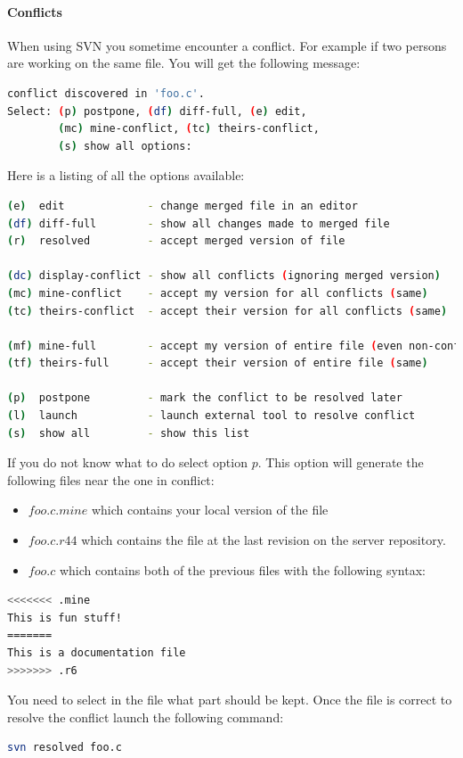 \paragraph{Conflicts}
\label{conflict}
When using SVN you sometime encounter a conflict. For example if two persons
are working on the same file. You will get the following message:
\begin{lstlisting}[language=bash]
conflict discovered in 'foo.c'.
Select: (p) postpone, (df) diff-full, (e) edit,
        (mc) mine-conflict, (tc) theirs-conflict,
        (s) show all options: 
\end{lstlisting}
Here is a listing of all the options available:
\begin{lstlisting}[language=bash]
(e)  edit             - change merged file in an editor
(df) diff-full        - show all changes made to merged file
(r)  resolved         - accept merged version of file

(dc) display-conflict - show all conflicts (ignoring merged version)
(mc) mine-conflict    - accept my version for all conflicts (same)
(tc) theirs-conflict  - accept their version for all conflicts (same)

(mf) mine-full        - accept my version of entire file (even non-conflicts)
(tf) theirs-full      - accept their version of entire file (same)

(p)  postpone         - mark the conflict to be resolved later
(l)  launch           - launch external tool to resolve conflict
(s)  show all         - show this list
\end{lstlisting}
%
If you do not know what to do select option $p$. This option will generate the
following files near the one in conflict:
\begin{itemize}
\item $foo.c.mine$ which contains your local version of the file
\item $foo.c.r44$ which contains the file at the last revision on the server
repository.
\item $foo.c$ which contains both of the previous files with the following
syntax:
\end{itemize}
\begin{lstlisting}[language=bash]
<<<<<<< .mine
This is fun stuff!
=======
This is a documentation file
>>>>>>> .r6
\end{lstlisting}
You need to select in the file what part should be kept. Once the file is
correct to resolve the conflict launch the following command:
\begin{lstlisting}[language=bash]
svn resolved foo.c
\end{lstlisting}
